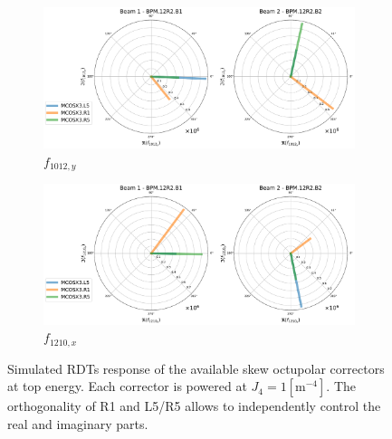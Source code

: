 \begin{figure}[!htb]
    \centering
    \begin{subfigure}{0.8\textwidth}
        \includegraphics[width=\textwidth]{./images/orthogonal_a4_inj_f1012_y.pdf}
        \caption{$f_{1012,y}$}
    \end{subfigure}
    \par\bigskip 
    \begin{subfigure}{0.8\textwidth}
        \includegraphics[width=\textwidth]{./images/orthogonal_a4_inj_f1210_x.pdf}
        \caption{$f_{1210,x}$}
    \end{subfigure}
    \caption{Simulated RDTs response of the available skew octupolar correctors at top energy.  Each
    corrector is powered at $J_4 = 1 [\text{m}^{-4}]$. The orthogonality of R1 and L5/R5 allows to
    independently control the real and imaginary parts.}
    \label{fig:skew_octupolar:response_correctors_polar}
\end{figure}



\subsection{}

